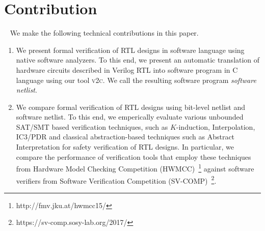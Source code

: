 \section{Contribution}~\label{contribution}
We make the following technical contributions in this paper.
%
\begin{enumerate}
\item We present formal verification of RTL designs in software language 
using native software analyzers.  To this end, we present an automatic 
translation of hardware circuits described in Verilog RTL into software 
program in C language using our tool \textsc{v2c}.  We call the resulting 
software program {\em software netlist}.  

\item We compare formal verification of RTL designs 
using bit-level netlist and software netlist.  
To this end, we emperically evaluate various unbounded SAT/SMT based verification techniques, 
such as $K$-induction, Interpolation, IC3/PDR and classical abstraction-based 
techniques such as Abstract Interpretation for safety verification of RTL designs.  
%    
In particular, we compare the performance of verification 
tools that employ these techniques from Hardware Model Checking Competition 
(HWMCC)~\footnote{http://fmv.jku.at/hwmcc15/} against software verifiers from Software 
Verification Competition (SV-COMP)~\footnote{https://sv-comp.sosy-lab.org/2017/}.


\end{enumerate}
